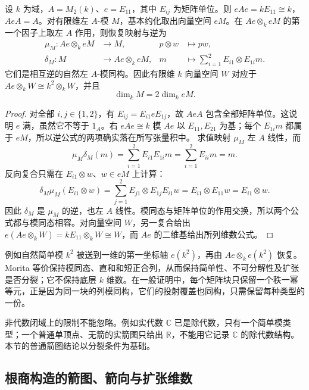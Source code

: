 \begin{example}\label{b5:exm:matrix-basic-reduction}
	设 \(k\) 为域，\(A=M_2(k)\)、\(e=E_{11}\)，其中 \(E_{ij}\) 为矩阵单位。则 \(eAe=kE_{11}\cong k\)，\(AeA=A\)。对有限维左 \(A\)-模 \(M\)，基本约化取出向量空间 \(eM\)。在 \(Ae\otimes_k eM\) 的第一个因子上取左 \(A\) 作用，则恢复映射与逆为
	\[
		\begin{aligned}
			\mu_M:Ae\otimes_k eM&\longrightarrow M, &p\otimes w&\longmapsto pw,\\
			\delta_M:M&\longrightarrow Ae\otimes_k eM, &m&\longmapsto\sum_{i=1}^2E_{i1}\otimes E_{1i}m.
		\end{aligned}
	\]
	它们是相互逆的自然左 \(A\)-模同构。因此有限维 \(k\) 向量空间 \(W\) 对应于 \(Ae\otimes_kW\cong k^2\otimes_kW\)，并且
	\[
		\dim_k M=2\dim_k eM.
	\]
\end{example}
\begin{proof}
	对全部 \(i,j\in\{1,2\}\)，有 \(E_{ij}=E_{i1}eE_{1j}\)，故 \(AeA\) 包含全部矩阵单位。这说明 \(e\) 满，虽然它不等于 \(1_A\)。右 \(eAe\cong k\) 模 \(Ae\) 以 \(E_{11},E_{21}\) 为基；每个 \(E_{1i}m\) 都属于 \(eM\)，所以逆公式的两项确实落在所写张量积中。 求值映射 \(\mu_M\) 左 \(A\) 线性，而
	\[
		\mu_M\delta_M(m)=\sum_{i=1}^2 E_{i1}E_{1i}m =\sum_{i=1}^2E_{ii}m=m.
	\]
	反向复合只需在 \(E_{i1}\otimes w\)、\(w\in eM\) 上计算：
	\[
		\delta_M\mu_M(E_{i1}\otimes w) =\sum_{j=1}^2E_{j1}\otimes E_{1j}E_{i1}w =E_{i1}\otimes E_{11}w=E_{i1}\otimes w.
	\]
	因此 \(\delta_M\) 是 \(\mu_M\) 的逆，也左 \(A\) 线性。模同态与矩阵单位的作用交换，所以两个公式都与模同态相容。对向量空间 \(W\)，另一复合给出 \(e(Ae\otimes_kW)=kE_{11}\otimes_kW\cong W\)，而 \(Ae\) 的二维基给出所列维数公式。
\end{proof}
例如自然简单模 \(k^2\) 被送到一维的第一坐标轴 \(e(k^2)\)，再由 \(Ae\otimes_k e(k^2)\) 恢复。Morita 等价保持模同态、直和和短正合列，从而保持简单性、不可分解性及扩张是否分裂；它不保持底层 \(k\) 维数。在一般证明中，每个矩阵块只保留一个秩一幂等元，正是因为同一块的列模同构，它们的投射覆盖也同构，只需保留每种类型的一份。

\ProseParagraphBreak

非代数闭域上的限制不能忽略。例如实代数 \(\mathbb C\) 已是除代数，只有一个简单模类型；一个普通单顶点、无箭的实箭图只给出 \(\mathbb R\)，不能用它记录 \(\mathbb C\) 的除代数结构。本节的普通箭图结论以分裂条件为基础。

\subsection{根商构造的箭图、箭向与扩张维数}
\label{b5:subsec:0905:02}

